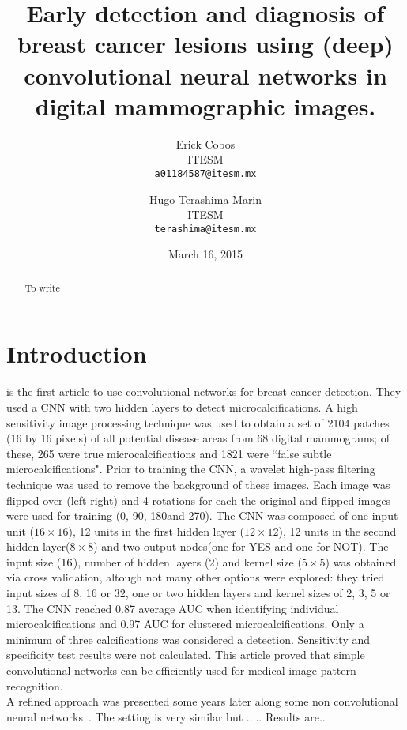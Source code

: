 \documentclass{report} %
\begin{document}
 

\author{Erick Cobos \\  ITESM\\ \texttt{a01184587@itesm.mx} \and Hugo Terashima Marin \\  ITESM \\ \texttt{terashima@itesm.mx}}
\title{Early detection and diagnosis of breast cancer lesions using (deep) convolutional neural networks in digital mammographic images.}
\date{March 16, 2015}
\maketitle

\begin{abstract}
To write
\end{abstract}


\chapter{Introduction}
\cite{Lo1995} is the first article to use convolutional networks for breast cancer detection. They used a CNN with two hidden layers to detect microcalcifications. A high sensitivity image processing technique was used to obtain a set of 2104 patches (16 by 16 pixels) of all potential disease areas from 68 digital mammograms; of these, 265 were true microcalcifications and 1821 were ``false subtle microcalcifications". Prior to training the CNN, a wavelet high-pass filtering technique was used to remove the background of these images. Each image was flipped over (left-right) and 4 rotations for each the original and flipped images were used for training (0\textdegree, 90\textdegree, 180\textdegree and 270\textdegree). The CNN was composed of one input unit ($16\times16$), 12 units in the first hidden layer ($12\times12$), 12 units in the second hidden layer($8\times 8$) and two output nodes(one for YES and one for NOT). The input size ($16\time16$), number of hidden layers ($2$) and kernel size ($5\times5$) was obtained via cross validation, altough not many other options were explored: they tried input sizes of 8, 16 or 32, one or two hidden layers and kernel sizes of 2, 3, 5 or 13. The CNN reached 0.87 average AUC when identifying individual microcalcifications and 0.97 AUC for clustered microcalcifications. Only a minimum of three calcifications was considered a detection. Sensitivity and specificity test results were not calculated. This article proved that simple convolutional networks can be efficiently used for medical image pattern recognition.
\\
A refined approach was presented some years later along some non convolutional neural networks~\cite{Lo1998}. The setting is very similar but ..... Results are..



\end{document}
